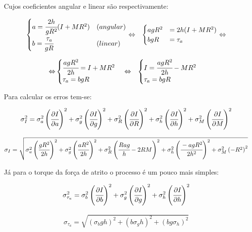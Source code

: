 \documentclass[a4paper]{article}
\begin{document}
Cujos coeficientes angular e linear são respectivamente:

\begin{eqnarray*}
\begin{cases}
a=\cfrac{2h}{gR^{2}}(I+MR^{2}) & (angular)\\
b=\cfrac{\tau_{a}}{gR} & (linear)
\end{cases} & \Leftrightarrow & \begin{cases}
agR^{2} & =2h(I+MR^{2})\\
bgR & =\tau_{a}
\end{cases}\Leftrightarrow
\end{eqnarray*}


\begin{eqnarray*}
\Leftrightarrow & \begin{cases}
\cfrac[r]{agR^{2}}{2h}=I+MR^{2}\\
\tau_{a}=bgR
\end{cases}\Leftrightarrow & \begin{cases}
I=\cfrac[r]{agR^{2}}{2h}-MR^{2}\\
\tau_{a}=bgR
\end{cases}
\end{eqnarray*}


Para calcular os erros tem-se:

$$ \sigma_{I}^{2}=\sigma_{a}^{2}\left(\cfrac[r]{\partial I}{\partial a}\right)^{2}+\sigma_{g}^{2}\left(\cfrac[r]{\partial I}{\partial g}\right)^{2}+\sigma_{R}^{2}\left(\cfrac{\partial I}{\partial R}\right)^{2}+\sigma_{h}^{2}\left(\cfrac[r]{\partial I}{\partial h}\right)^{2}+\sigma_{M}^{2}\left(\cfrac{\partial I}{\partial M}\right)^{2} $$

\begin{align}
\sigma_{I}=\sqrt{\sigma_{a}^{2}\left(\cfrac[r]{gR^{2}}{2h}\right)^{2}+\sigma_{g}^{2}\left(\cfrac[r]{aR^{2}}{2h}\right)^{2}+\sigma_{R}^{2}\left(\cfrac{Rag}{h}-2RM\right)^{2}+\sigma_{h}^{2}\left(\cfrac[r]{-agR^{2}}{2h^{2}}\right)^{2}+\sigma_{M}^{2}\left(-R^{2}\right)^{2}}\end{align}

Já para o torque da força de atrito o processo é um pouco mais simples:


$$\sigma_{\tau_{a}}^{2}=\sigma_{b}^{2}\left(\cfrac[r]{\partial I}{\partial b}\right)^{2}+\sigma_{g}^{2}\left(\cfrac[r]{\partial I}{\partial g}\right)^{2}+\sigma_{h}^{2}\left(\cfrac[r]{\partial I}{\partial h}\right)^{2}$$

\begin{align}
\sigma_{\tau_{a}}=\sqrt{(\sigma_{b}gh)^{2}+(b\sigma_{g}h)^{2}+(bg\sigma_{h})^{2}}
\end{align}
\end{document}
